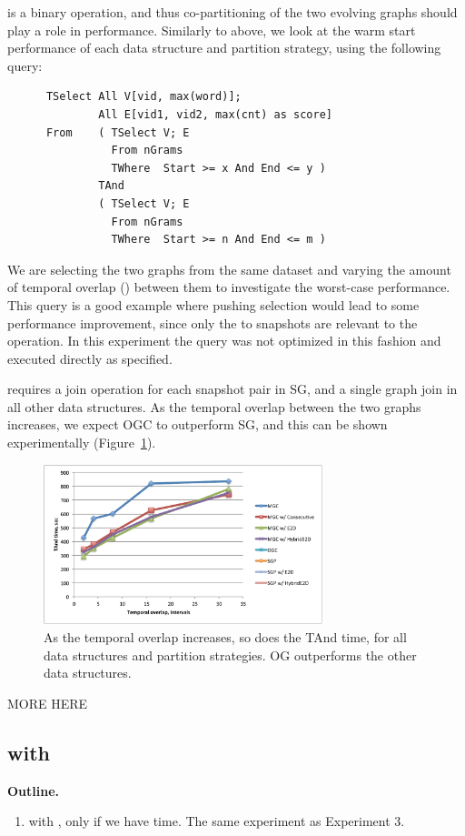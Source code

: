  is a binary operation, and thus co-partitioning of the
two evolving graphs should play a role in performance.  Similarly to
 above, we look at the warm start performance of each
data structure and partition strategy, using the following query:

\begin{small}
\begin{verbatim}
      TSelect All V[vid, max(word)];
              All E[vid1, vid2, max(cnt) as score]
      From    ( TSelect V; E
                From nGrams
                TWhere  Start >= x And End <= y )
              TAnd
              ( TSelect V; E
                From nGrams
                TWhere  Start >= n And End <= m )      
\end{verbatim}
\end{small}

We are selecting the two graphs from the same dataset and varying the
amount of temporal overlap () between them to investigate
the worst-case performance.  This query is a good example where
pushing selection would lead to some performance improvement, since
only the  to  snapshots are relevant to the
operation.  In this experiment the query was not optimized in this
fashion and executed directly as specified.

 requires a join operation for each snapshot pair in SG,
and a single graph join in all other data structures.  As the temporal
overlap between the two graphs increases, we expect OGC to outperform
SG, and this can be shown experimentally (Figure~\ref{fig:tandall}).

\begin{figure}[t!]
\includegraphics[width=3.2in]{figs/tand_all_warm.pdf}
\caption{As the temporal overlap increases, so does the TAnd time, for
  all data structures and partition strategies.  OG outperforms the
  other data structures.}
\label{fig:tandall}
\end{figure}

MORE HERE

\subsection{ with }

{\bf Outline.}

\begin{enumerate}

\item {} with , only if we have time. The
  same experiment as Experiment 3.

\end{enumerate}
